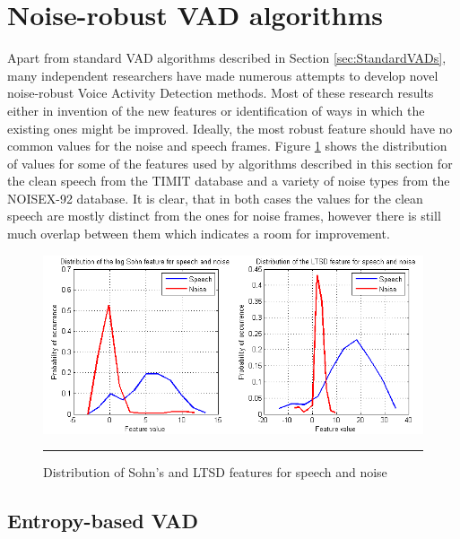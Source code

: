 
\section{Noise-robust VAD algorithms}
\label{sec:RobustVADs}

Apart from standard VAD algorithms described in Section \ref{sec:StandardVADs}, many independent researchers have made numerous attempts to develop novel noise-robust Voice Activity Detection methods. Most of these research results either in invention of the new features or identification of ways in which the existing ones might be improved. Ideally, the most robust feature should have no common values for the noise and speech frames. Figure \ref{fig:featureDist} shows the distribution of values for some of the features used by algorithms described in this section for the clean speech from the TIMIT \cite{TIMIT} database and a variety of noise types from the NOISEX-92 \cite{NOISEX} database. It is clear, that in both cases the values for the clean speech are mostly distinct from the ones for noise frames, however there is still much overlap between them which indicates a room for improvement.

\begin{figure}[htbp]
	\centering
		\includegraphics[width=0.9\columnwidth]{Figures/Chapter2/featureDist.png}
		\rule{37em}{0.5pt}
	\caption[Distribution of Sohn's and LTSD features for speech and noise]{Distribution of Sohn's \cite{SohnInitial} and LTSD \cite{LTSD} features for speech and noise}
	\label{fig:featureDist}
\end{figure}

\subsection{Entropy-based VAD}

